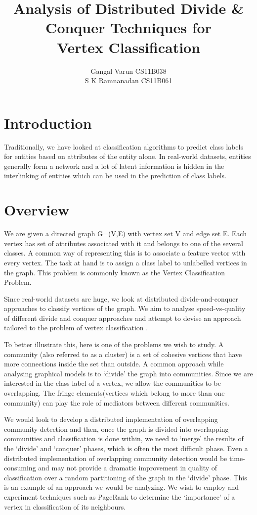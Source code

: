 \documentclass{article}
\begin{document}
\title{\textbf{Analysis of Distributed Divide \& Conquer Techniques for \\Vertex Classification}}
\author{ Gangal Varun CS11B038 \\
		 S K Ramnanadan CS11B061\\
[0.2in]
}
\date{}
\maketitle
\section*{Introduction}
Traditionally, we have looked at classification algorithms to predict class labels for entities based on attributes of the entity alone. In real-world datasets, entities generally form a network and a lot of latent information is hidden in the interlinking of entities which can be used in the prediction of class labels. 
 


\section*{Overview}
We are given a directed graph G=(V,E) with vertex set V and edge set E. Each vertex has set of attributes associated with it and belongs to one of the several classes. A common way of representing this is to associate a feature vector with every vertex. The task at hand is to assign a class label to unlabelled vertices in the graph. This problem is commonly known as the Vertex Classification Problem. 

Since real-world datasets are huge, we look at distributed divide-and-conquer approaches to classify vertices of the graph. We aim to analyse speed-vs-quality of different divide and conquer approaches and attempt to devise an approach tailored to the problem of vertex classification . 

To better illustrate this, here is one of the problems we wish to study. A community (also referred to as a cluster) is a set of cohesive vertices that have more connections inside the set than outside. A common approach while analysing graphical models is to ‘divide’ the graph into communities. Since we are interested in the class label of a vertex, we allow the communities to be overlapping. The fringe elements(vertices which belong to more than one community) can play the role of mediators between different communities. 

We would look to develop a distributed implementation of overlapping community detection and then, once the graph is divided into overlapping communities and classification is done within, we need to ‘merge’ the results of the ‘divide’ and ‘conquer’ phases, which is often the most difficult phase. Even a distributed implementation of overlapping community detection would be time-consuming and may not provide a dramatic improvement in quality of classification over a random partitioning of the graph in the ‘divide’ phase. This is an example of an approach we would be analyzing. We wish to employ and experiment techniques such as PageRank to determine the ‘importance’ of a vertex in classification of its neighbours.
\end{document}
